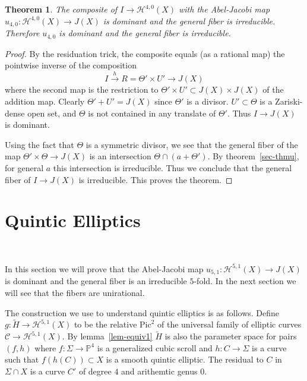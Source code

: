\documentclass[amssymb,twoside,12 pt,amscd,reqno]{amsart}
\theoremstyle{plain}
\newtheorem{thm}{Theorem}[section]
\theoremstyle{definition}
\newcommand{\Hdg}[2]{\mathcal{H}^{#1,#2}}
\newcommand{\PP}{\mathbb{P}}
\def\ps{\vspace{4pt}}
\begin{document}
\ps

\begin{thm}\label{thm-irrfib} 
The composite of $I\rightarrow
\Hdg{4}{0}(X)$ with the Abel-Jacobi map
$u_{4,0}:\Hdg{4}{0}(X)\rightarrow J(X)$ is dominant and the
general fiber is irreducible.  Therefore $u_{4,0}$ is dominant and the 
general fiber is irreducible.
\end{thm}

\begin{proof}
By the residuation trick, the composite equals (as a rational map) the
pointwise inverse of the composition
\begin{equation}
I\xrightarrow{h} R = \Theta'\times U' \rightarrow J(X)
\end{equation}
where the second map is the restriction to $\Theta'\times U'\subset
J(X)\times J(X)$ of the addition map.  Clearly $\Theta'+U'= J(X)$ since
$\Theta'$ is a divisor. $U'\subset \Theta$ is a Zariski-dense open
set, and $\Theta$ is not contained in any translate of
$\Theta'$.  Thus $I\rightarrow J(X)$ is dominant.  

\ps

Using the fact that $\Theta$ is a symmetric divisor, we see that the
general fiber of the map $\Theta'\times\Theta \rightarrow J(X)$ is an
intersection $\Theta\cap (a+\Theta')$.  By theorem~\ref{sec-thmu}, for 
general $a$ this intersection is irreducible.  Thus we conclude that
the general fiber of $I\rightarrow J(X)$ is irreducible.
This proves the theorem.
\end{proof}

\section{Quintic Elliptics}~\label{subsec-irr51}

In this section we will prove that the Abel-Jacobi map
$u_{5,1}:\Hdg{5}{1}(X)\rightarrow J(X)$ is dominant and the general
fiber is an irreducible $5$-fold.  In the next section we will see
that the fibers are unirational.

\ps

The construction we use to understand quintic elliptics is as
follows.  Define $g:\widetilde{H}\rightarrow \Hdg{5}{1}(X)$ to be the
relative $\text{Pic}^2$ of the universal family of elliptic curves
$\mathcal{C}\rightarrow \Hdg{5}{1}(X)$.  By lemma~\ref{lem-equiv1}
$\widetilde{H}$ is also the parameter space for pairs $(f,h)$ where
$f:\Sigma\rightarrow \PP^4$ is a generalized cubic scroll and
$h:C\rightarrow \Sigma$ is a curve such that $f(h(C))\subset X$ is a
smooth quintic elliptic.  The residual to $C$ in $\Sigma\cap X$ is a
curve $C'$ of degree $4$ and arithemtic genus $0$.  
\end{document}
